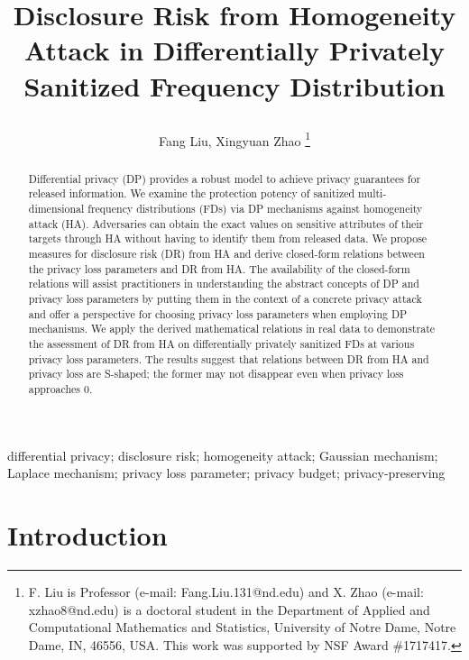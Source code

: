 \documentclass[10pt,journal,compsoc]{IEEEtran}
\begin{document}
\title{\huge Disclosure Risk from Homogeneity Attack in Differentially Privately Sanitized Frequency Distribution\\
\author{Fang Liu,  Xingyuan Zhao
\thanks{F. Liu is Professor (e-mail: Fang.Liu.131@nd.edu) and X. Zhao  (e-mail: xzhao8@nd.edu)  is a doctoral student in the Department of Applied and Computational Mathematics and Statistics, University of Notre Dame, Notre Dame, IN, 46556, USA.  This work was supported by NSF Award \#1717417.}\vspace{-24pt}
}}
\maketitle
\vspace{-54pt}
\begin{abstract}
Differential privacy (DP)  provides a robust model to achieve privacy guarantees for released information. We examine the protection potency of sanitized multi-dimensional frequency distributions (FDs) via DP mechanisms against homogeneity attack (HA). Adversaries can obtain the exact values on  sensitive attributes of their targets through HA without having to identify them from released data. We propose measures for disclosure risk (DR) from HA and derive closed-form relations between the privacy loss parameters and DR from HA. The availability of the closed-form relations will assist practitioners in understanding the abstract concepts of DP and privacy loss parameters by putting them in the context of a concrete privacy attack and offer a perspective for choosing privacy loss parameters when employing DP mechanisms. We apply the derived mathematical relations in real data to demonstrate the assessment of DR from HA on differentially privately sanitized FDs at various privacy loss parameters. The results suggest that relations between DR from HA and privacy loss are S-shaped; the former may not disappear even when privacy loss approaches 0. \vspace{-6pt}
\end{abstract} 
\begin{IEEEkeywords}
differential privacy;   disclosure risk;  homogeneity attack;  Gaussian mechanism;  Laplace mechanism;  privacy loss parameter; privacy budget; privacy-preserving
\end{IEEEkeywords}

\vspace{-9pt}
\section{Introduction}\vspace{-3pt}
\end{document}
